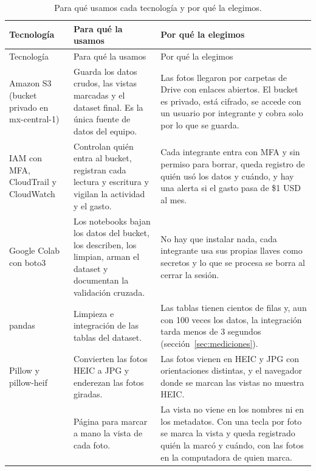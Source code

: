 \documentclass[11pt,letterpaper,DIV=12]{scrartcl}
\begin{document}
{\small
\begin{xltabular}{\textwidth}{>{\raggedright\arraybackslash}p{0.17\textwidth}>{\raggedright\arraybackslash}X>{\raggedright\arraybackslash}X}
  \caption{Para qué usamos cada tecnología y por qué la elegimos.}\label{tab:tecnologias} \\
  \toprule
  Tecnología & Para qué la usamos & Por qué la elegimos \\
  \midrule
  \endfirsthead
  \toprule
  Tecnología & Para qué la usamos & Por qué la elegimos \\
  \midrule
  \endhead
  \bottomrule
  \endlastfoot
  Amazon S3 (bucket privado en mx-central-1) & Guarda los datos crudos, las vistas marcadas y el dataset final. Es la única fuente de datos del equipo. & Las fotos llegaron por carpetas de Drive con enlaces abiertos. El bucket es privado, está cifrado, se accede con un usuario por integrante y cobra solo por lo que se guarda. \\
  \addlinespace
  IAM con MFA, CloudTrail y CloudWatch & Controlan quién entra al bucket, registran cada lectura y escritura y vigilan la actividad y el gasto. & Cada integrante entra con MFA y sin permiso para borrar, queda registro de quién usó los datos y cuándo, y hay una alerta si el gasto pasa de \$1 USD al mes. \\
  \addlinespace
  Google Colab con boto3 & Los notebooks bajan los datos del bucket, los describen, los limpian, arman el dataset y documentan la validación cruzada. & No hay que instalar nada, cada integrante usa sus propias llaves como secretos y lo que se procesa se borra al cerrar la sesión. \\
  \addlinespace
  pandas & Limpieza e integración de las tablas del dataset. & Las tablas tienen cientos de filas y, aun con 100 veces los datos, la integración tarda menos de 3 segundos (sección~\ref{sec:mediciones}). \\
  \addlinespace
  Pillow y pillow-heif & Convierten las fotos HEIC a JPG y enderezan las fotos giradas. & Las fotos vienen en HEIC y JPG con orientaciones distintas, y el navegador donde se marcan las vistas no muestra HEIC. \\
  \addlinespace
   & Página para marcar a mano la vista de cada foto. & La vista no viene en los nombres ni en los metadatos. Con una tecla por foto se marca la vista y queda registrado quién la marcó y cuándo, con las fotos en la computadora de quien marca. \\

\end{xltabular}}
\end{document}
